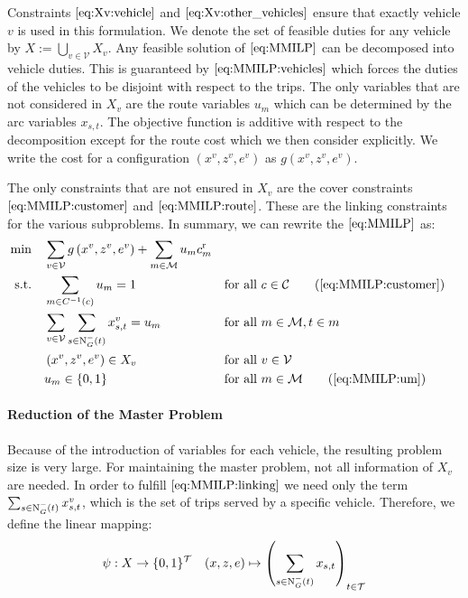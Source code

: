 Constraints $\eqref{eq:Xv:vehicle}$ and $\eqref{eq:Xv:other_vehicles}$ ensure that exactly vehicle $v$ is used in this formulation. We denote the set of feasible duties for any vehicle by $X:=\bigcup_{v\in\mathcal{V}}X_v$. Any feasible solution of $\eqref{eq:MMILP}$ can be decomposed into vehicle duties. This is guaranteed by $\eqref{eq:MMILP:vehicles}$ which forces the duties of the vehicles to be disjoint with respect to the trips. The only variables that are not considered in $X_v$ are the route variables $u_m$ which can be determined by the arc variables $x_{s,t}$. The objective function is additive with respect to the decomposition except for the route cost which we then consider explicitly. We write the cost for a configuration $\left(x^v,z^v,e^v\right)$ as $g\left(x^v,z^v,e^v\right)$.

The only constraints that are not ensured in $X_v$ are the cover constraints $\eqref{eq:MMILP:customer}$ and $\eqref{eq:MMILP:route}$. These are the linking constraints for the various subproblems. In summary, we can rewrite the $\eqref{eq:MMILP}$ as:
\begin{align}
	\min \quad & \sum_{v\in\mathcal{V}}g\left(x^v,z^v,e^v\right) + \sum_{m\in\mathcal{M}} u_m \croute_m \nonumber \\
	\text{s.t.} \quad & \sum_{m\in C^{-1}(c)} u_m = 1 && \text{for all } c\in\mathcal{C} \tag{\ref{eq:MMILP:customer}} \\
	& \sum_{v\in\mathcal{V}}\sum_{s\in\Nin(t)}x^v_{s,t} = u_m && \text{for all } m\in\mathcal{M},t\in m \label{eq:MMILP:linking} \\
	& \left(x^v,z^v,e^v\right)\in X_v && \text{for all } v\in\mathcal{V} \nonumber \\
	& u_m\in\{0,1\} && \text{for all } m\in\mathcal{M} \tag{\ref{eq:MMILP:um}}
\end{align}

\paragraph{Reduction of the Master Problem} \parfill

Because of the introduction of variables for each vehicle, the resulting problem size is very large. For maintaining the master problem, not all information of $X_v$ are needed. In order to fulfill $\eqref{eq:MMILP:linking}$ we need only the term ${\sum_{s\in\operatorname{N}_G^-(t)} x^v_{s,t}}$, which is the set of trips served by a specific vehicle. Therefore, we define the linear mapping: 
\begin{align*}
	\psi:X\to\{0,1\}^{\mathcal{T}} && (x,z,e)\mapsto\left(\sum_{s\in\operatorname{N}_G^-(t)}x_{s,t}\right)_{t\in\mathcal{T}} \label{eq:psi}
\end{align*}

